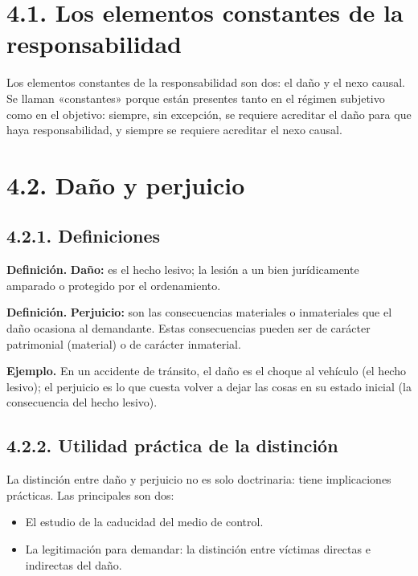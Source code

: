 
\section{4.1. Los elementos constantes de la responsabilidad}
Los elementos constantes de la responsabilidad son dos: el daño y el nexo causal. Se llaman «constantes» porque están presentes tanto en el régimen subjetivo como en el objetivo: siempre, sin excepción, se requiere acreditar el daño para que haya responsabilidad, y siempre se requiere acreditar el nexo causal.

\section{4.2. Daño y perjuicio}
\subsection{4.2.1. Definiciones}
\begin{definicion}
\textcolor[HTML]{1F3864}{\textbf{Definición. }}\textbf{Daño: }es el hecho lesivo; la lesión a un bien jurídicamente amparado o protegido por el ordenamiento.
\par
\textcolor[HTML]{1F3864}{\textbf{Definición. }}\textbf{Perjuicio: }son las consecuencias materiales o inmateriales que el daño ocasiona al demandante. Estas consecuencias pueden ser de carácter patrimonial (material) o de carácter inmaterial.
\end{definicion}
\begin{ejemplo}
\textcolor[HTML]{4F6228}{\textbf{Ejemplo. }}En un accidente de tránsito, el daño es el choque al vehículo (el hecho lesivo); el perjuicio es lo que cuesta volver a dejar las cosas en su estado inicial (la consecuencia del hecho lesivo).
\end{ejemplo}
\subsection{4.2.2. Utilidad práctica de la distinción}
La distinción entre daño y perjuicio no es solo doctrinaria: tiene implicaciones prácticas. Las principales son dos:

\begin{itemize}
\item El estudio de la caducidad del medio de control.
\item La legitimación para demandar: la distinción entre víctimas directas e indirectas del daño.
\end{itemize}
